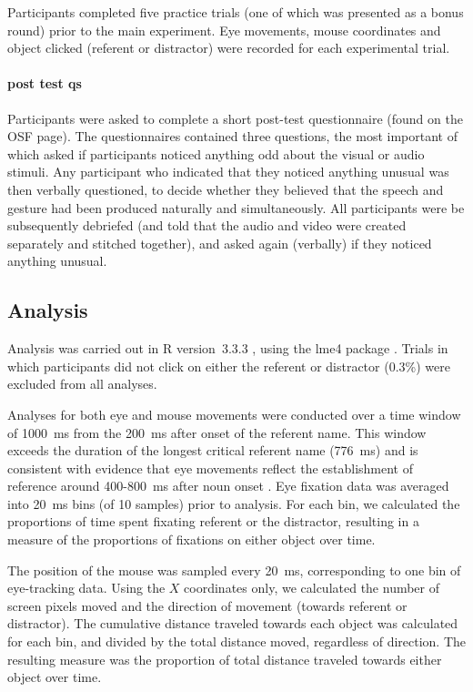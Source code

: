 \documentclass[a4paper,man,natbib]{apa6}
\begin{document}
Participants completed five practice trials (one of which was presented as a bonus round) prior to the main experiment. 
Eye movements, mouse coordinates and object clicked (referent or distractor) were recorded for each experimental trial.


\paragraph{post test qs}
Participants were asked to complete a short post-test questionnaire (found on the OSF page). 
The questionnaires contained three questions, the most important of which asked if participants noticed anything odd about the visual or audio stimuli.
Any participant who indicated that they noticed anything unusual was then verbally questioned, to decide whether they believed that the speech and gesture had been produced naturally and simultaneously.
All participants were be subsequently debriefed (and told that the audio and video were created separately and stitched together), and asked again (verbally) if they noticed anything unusual. 


\subsection{Analysis}

Analysis was carried out in R version~3.3.3 \citep{rbase}, using the lme4 package \citep{lme4}. 
Trials in which participants did not click on either the referent or distractor (0.3\%) were excluded from all analyses. 

Analyses for both eye and mouse movements were conducted over a time window of 1000~ms from the 200~ms after onset of the referent name.
This window exceeds the duration of the longest critical referent name (776~ms) and is consistent with evidence that eye movements reflect the establishment of reference around 400-800~ms after noun onset \citep{Eberhard1995}.
Eye fixation data was averaged into 20~ms bins (of 10 samples) prior to analysis.
For each bin, we calculated the proportions of time spent fixating referent or the distractor, resulting in a measure of the proportions of fixations on either object over time.

The position of the mouse was sampled every 20~ms, corresponding to one bin of eye-tracking data.
Using the $X$ coordinates only, we calculated the number of screen pixels moved and the direction of movement (towards referent or distractor).
The cumulative distance traveled towards each object was calculated for each bin, and divided by the total distance moved, regardless of direction.
The resulting measure was the proportion of total distance traveled towards either object over time.
\end{document}
